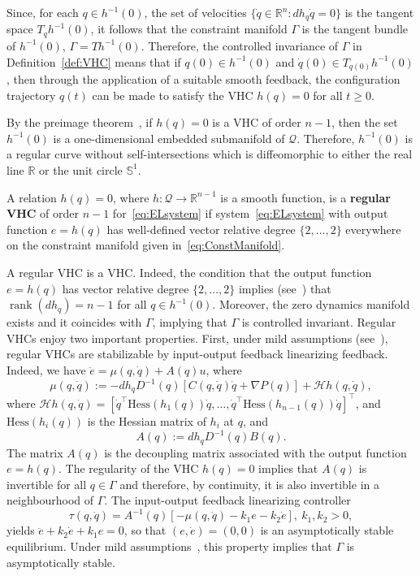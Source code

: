 Since, for each $q \in h^{-1}(0)$, the set of velocities $\{\dot q \in
\mathbb{R}^n : dh_q \dot q=0\}$ is the tangent space $T_q h^{-1}(0)$, it
follows that the constraint manifold $\Gamma$ is the tangent bundle of
$h^{-1}(0)$, $\Gamma = T h^{-1}(0)$. Therefore, the controlled
invariance of $\Gamma$ in Definition~\ref{def:VHC} means that if $q(0)
\in h^{-1}(0)$ and $\dot q(0) \in T_{q(0)} h^{-1}(0)$, then
through the application of a suitable smooth feedback, the
configuration trajectory $q(t)$ can be made to satisfy the VHC
$h(q)=0$ for all $t\geq 0$.

By the preimage theorem~\cite{GuiPol:74}, if $h(q)=0$ is a VHC of
order $n-1$, then the set $h^{-1}(0)$ is a one-dimensional
embedded submanifold of $\mathcal{Q}$. Therefore, $h^{-1}(0)$ is a regular
curve without self-intersections which is diffeomorphic to either the
real line $\mathbb{R}$ or the unit circle $\mathbb{S}^1$.
\begin{definition}
	A relation $h(q)=0$, where $h : \mathcal{Q} \to \mathbb{R}^{n-1}$ is a smooth
	function, is a {\bf regular VHC} of order $n-1$
	for~\eqref{eq:ELsystem} if system~\eqref{eq:ELsystem} with output
	function $e=h(q)$ has well-defined vector relative degree
	$\{2,\dots,2\}$ everywhere on the constraint manifold given
	in~\eqref{eq:ConstManifold}.
\end{definition}

A regular VHC is a VHC. Indeed, the condition that the output function
$e =h(q)$ has vector relative degree $\{2,\ldots,2\}$ implies
(see~\cite{Isi95}) that $\operatorname{rank}(dh_q)=n-1$ for all $q \in
h^{-1}(0)$. Moreover, the zero dynamics manifold exists and it
coincides with $\Gamma$, implying that $\Gamma$ is controlled
invariant.  Regular VHCs enjoy two important properties.  First, under
mild assumptions (see~\cite{Maggiore-2012}), regular VHCs are
stabilizable by input-output feedback linearizing feedback. Indeed, we
have $\ddot e = \mu(q,\dot q) + A(q) u$, where
\[
\mu(q,\dot{q}):= -dh_qD^{-1}(q)[C(q,\dot{q})\dot{q}+\nabla P(q)]+ 
\mathcal{H}h(q,\dot{q}), 
\] 
where $\mathcal{H}h(q,\dot{q})=[\dot{q}^\top
\mbox{Hess}(h_1(q))\dot{q},\dots,\dot{q}^\top
\mbox{Hess}(h_{n-1}(q))\dot{q}]^\top$, and $\mbox{Hess}(h_i(q))$ is
the Hessian matrix of $h_i$ at $q$, and
\[
A(q):= dh_qD^{-1}(q)B(q).
\]
The matrix $A(q)$ is the decoupling matrix associated with the output
function $e =h(q)$. The regularity of the VHC $h(q)=0$ implies that
$A(q)$ is invertible for all $q \in \Gamma$ and therefore, by
continuity, it is also invertible in a neighbourhood of $\Gamma$.  The
input-output feedback linearizing controller
\begin{equation}
\label{eq:feedbackVHC}
\tau(q,\dot{q}) = A^{-1}(q)[-\mu(q,\dot{q})-k_1e-k_2\dot{e}], \ k_1,k_2>0,
\end{equation}
yields $\ddot e + k_2 \dot e + k_1 e =0$, so that $(e,\dot e)=(0,0)$
is an asymptotically stable equilibrium.  Under mild
assumptions~\cite{Maggiore-2012}, this property implies that $\Gamma$
is asymptotically stable.

